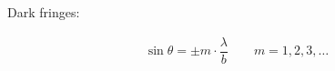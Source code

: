 Dark fringes:

\begin{equation*}
  \begin{aligned}
    \sin \theta = \pm m \cdot \dfrac{\lambda}{b} \quad\quad m = 1,2,3,\dots
  \end{aligned}
\end{equation*}




